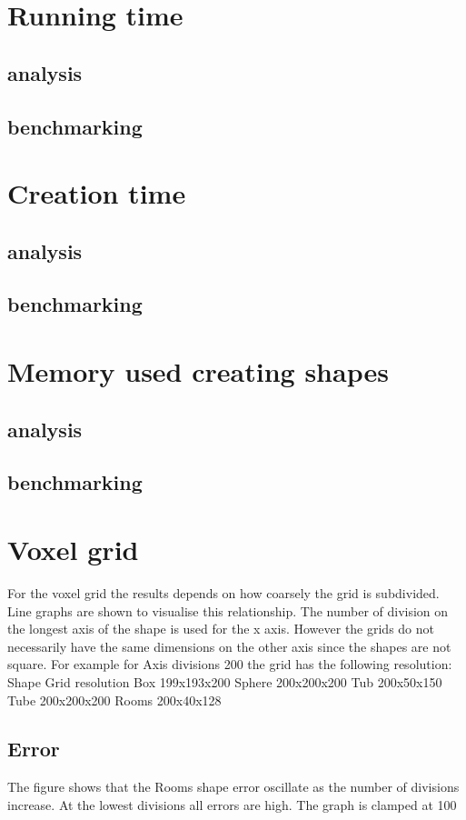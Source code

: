 \documentclass[11pt,twoside,a4paper]{report}
\begin{document}
\section{Running time}
\subsection{analysis}
\subsection{benchmarking}

\section{Creation time}
\subsection{analysis}
\subsection{benchmarking}

\section{Memory used creating shapes}
\subsection{analysis}
\subsection{benchmarking}
    



\section{Voxel grid}
For the voxel grid the results depends on how coarsely the grid is subdivided. Line graphs are shown to visualise this relationship. The number of division on the longest axis of the shape is used for the x axis. However the grids do not necessarily have the same dimensions on the other axis since the shapes are not square. For example for Axis divisions 200 the grid has the following resolution:
Shape
Grid resolution
Box
199x193x200
Sphere
200x200x200
Tub
200x50x150
Tube
200x200x200
Rooms
200x40x128

\subsection{Error}
The figure shows that the Rooms shape error oscillate as the number of divisions increase. At the lowest divisions all errors are high. The graph is clamped at 100%
\end{document}
